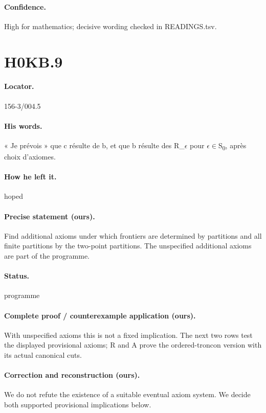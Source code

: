 \paragraph{Confidence.} High for mathematics; decisive wording checked in READINGS.tsv.

\section*{H0KB.9}\label{statement:H0KB.9}
\paragraph{Locator.} 156-3/004.5

\paragraph{His words.} « Je prévois » que c résulte de b, et que b résulte des R\_\ensuremath{\epsilon} pour \ensuremath{\epsilon}\ensuremath{\in}S\textsubscript{0}, après choix d’axiomes.

\paragraph{How he left it.} hoped

\paragraph{Precise statement (ours).} Find additional axioms under which frontiers are determined by partitions and all finite partitions by the two-point partitions. The unspecified additional axioms are part of the programme.

\paragraph{Status.} programme

\paragraph{Complete proof / counterexample application (ours).} With unspecified axioms this is not a fixed implication. The next two rows test the displayed provisional axioms; R and A prove the ordered-troncon version with its actual canonical cuts.

\paragraph{Correction and reconstruction (ours).} We do not refute the existence of a suitable eventual axiom system. We decide both supported provisional implications below.


